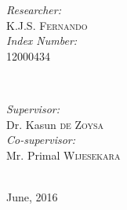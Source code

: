 \begin{titlepage}
\begin{minipage}{0.4\textwidth}
\begin{flushleft} \large
\emph{Researcher:}\\
K.J.S. \textsc{Fernando}\\ %
\emph{Index Number:}\\
12000434
\end{flushleft}
\end{minipage}
~
\begin{minipage}{0.4\textwidth}
\begin{flushright} \large
\emph{Supervisor:} \\
Dr. Kasun \textsc{de Zoysa}\\ %
\emph{Co-supervisor:} \\
Mr. Primal \textsc{Wijesekara}
\end{flushright}
\end{minipage}\\[2cm]

{\large June, 2016} %


\vfill %

\end{titlepage}


\tableofcontents

\mainmatter


